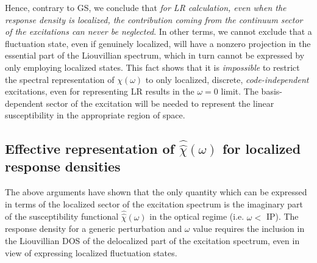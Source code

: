 \documentclass[reprint,aps,prb]{revtex4-1}
\newcommand{\op}[1]{\hat {#1}}
\newcommand{\sop}[1]{\op{\op {#1}}}
\begin{document}
Hence, contrary to GS, we conclude that \emph{for LR calculation, even when the response density is localized, the contribution coming from the
continuum sector of the excitations can never be neglected}. In other terms, we cannot exclude that a fluctuation state, even if genuinely localized, will have a nonzero projection in the essential part of the Liouvillian spectrum, which in turn cannot be expressed by only employing localized states.
This fact shows that it is \emph{impossible} to restrict the spectral representation of $\chi(\omega)$ to only localized, discrete, \emph{code-independent} excitations, even for representing LR results in the $\omega=0$ limit. The basis-dependent sector of the excitation will be needed to
represent the linear susceptibility in the appropriate region of space.

\subsection{Effective representation of $\sop \chi(\omega)$ for localized response densities}
The above arguments have shown that the only quantity which can be expressed in terms of the localized sector of the excitation spectrum is the imaginary part of the susceptibility functional $\sop \chi(\omega)$ in the optical regime (i.e. $\omega <$  IP). The response density for a generic perturbation and $\omega$ value requires the inclusion in the Liouvillian DOS of the delocalized part of the excitation spectrum, even in view of expressing localized fluctuation states.
\end{document}
